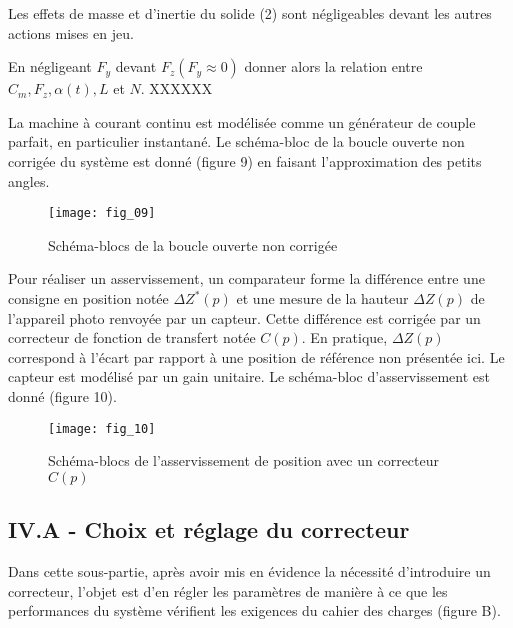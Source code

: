 Les effets de masse et d'inertie du solide (2) sont négligeables devant les autres actions mises en jeu.

\ifprof
\begin{corrige}
\end{corrige}
\else
\fi

En négligeant $F_{y}$ devant $F_{z}\left(F_{y} \approx 0\right)$ donner alors la relation entre $C_{m}, F_{z}, \alpha(t), L$ et $N$.
XXXXXX



La machine à courant continu est modélisée comme un générateur de couple parfait, en particulier instantané. Le schéma-bloc de la boucle ouverte non corrigée du système est donné (figure 9) en faisant l'approximation des petits angles.

\begin{figure}[H]
\centering
\texttt{[image: fig\_09]}
\caption{\label{fig:09} Schéma-blocs de la boucle ouverte non corrigée}
\end{figure}


Pour réaliser un asservissement, un comparateur forme la différence entre une consigne en position notée $\Delta Z^{*}(p)$ et une mesure de la hauteur $\Delta Z(p)$ de l'appareil photo renvoyée par un capteur. Cette différence est corrigée par un correcteur de fonction de transfert notée $C(p)$. En pratique, $\Delta Z(p)$ correspond à l'écart par rapport à une position de référence non présentée ici. Le capteur est modélisé par un gain unitaire. Le schéma-bloc d'asservissement est donné (figure 10).

\begin{figure}[H]
\centering
\texttt{[image: fig\_10]}
\caption{\label{fig:10} Schéma-blocs de l'asservissement de position avec un correcteur $C(p)$}
\end{figure}



\subsection{IV.A - Choix et réglage du correcteur}
Dans cette sous-partie, après avoir mis en évidence la nécessité d'introduire un correcteur, l'objet est d'en régler les paramètres de manière à ce que les performances du système vérifient les exigences du cahier des charges (figure B).

